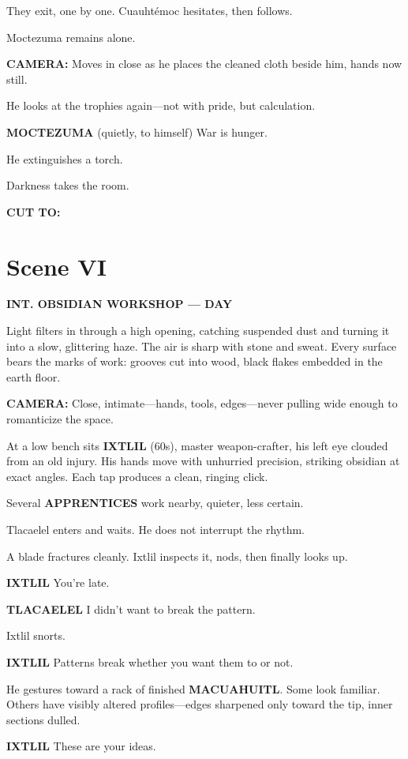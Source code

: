 \documentclass[12pt]{article}
\begin{document}
They exit, one by one. Cuauhtémoc hesitates, then follows.

Moctezuma remains alone.

\textbf{CAMERA:} Moves in close as he places the cleaned cloth beside him, hands now still.

He looks at the trophies again—not with pride, but calculation.

\textbf{MOCTEZUMA}  
(quietly, to himself)  
War is hunger.

He extinguishes a torch.

Darkness takes the room.

\textbf{CUT TO:}

\section*{Scene VI}

\textbf{INT. OBSIDIAN WORKSHOP — DAY}

Light filters in through a high opening, catching suspended dust and turning it into a slow, glittering haze. The air is sharp with stone and sweat. Every surface bears the marks of work: grooves cut into wood, black flakes embedded in the earth floor.

\textbf{CAMERA:} Close, intimate—hands, tools, edges—never pulling wide enough to romanticize the space.

At a low bench sits \textbf{IXTLIL} (60s), master weapon-crafter, his left eye clouded from an old injury. His hands move with unhurried precision, striking obsidian at exact angles. Each tap produces a clean, ringing click.

Several \textbf{APPRENTICES} work nearby, quieter, less certain.

Tlacaelel enters and waits. He does not interrupt the rhythm.

A blade fractures cleanly. Ixtlil inspects it, nods, then finally looks up.

\textbf{IXTLIL}  
You’re late.

\textbf{TLACAELEL}  
I didn’t want to break the pattern.

Ixtlil snorts.

\textbf{IXTLIL}  
Patterns break whether you want them to or not.

He gestures toward a rack of finished \textbf{MACUAHUITL}. Some look familiar. Others have visibly altered profiles—edges sharpened only toward the tip, inner sections dulled.

\textbf{IXTLIL}  
These are your ideas.
\end{document}
